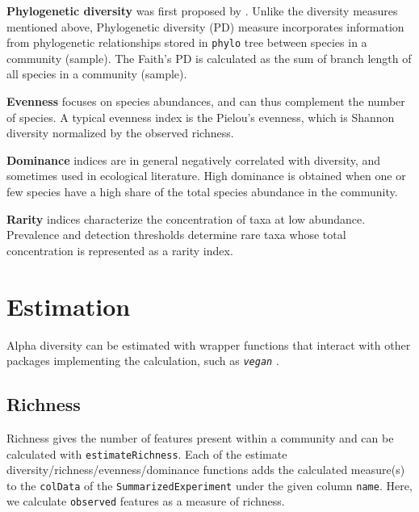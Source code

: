 \documentclass[
]{book}
\newenvironment{Shaded}{\begin{snugshade}}{\end{snugshade}}
\newcommand{\AttributeTok}[1]{\textcolor[rgb]{0.77,0.63,0.00}{#1}}
\newcommand{\FunctionTok}[1]{\textcolor[rgb]{0.00,0.00,0.00}{#1}}
\newcommand{\NormalTok}[1]{#1}
\newcommand{\OtherTok}[1]{\textcolor[rgb]{0.56,0.35,0.01}{#1}}
\newcommand{\SpecialCharTok}[1]{\textcolor[rgb]{0.00,0.00,0.00}{#1}}
\newcommand{\StringTok}[1]{\textcolor[rgb]{0.31,0.60,0.02}{#1}}
\begin{document}
\textbf{Phylogenetic diversity} was first proposed by \citep{Faith1992}. Unlike the
diversity measures mentioned above, Phylogenetic diversity (PD)
measure incorporates information from phylogenetic relationships
stored in \texttt{phylo} tree between species in a community (sample). The
Faith's PD is calculated as the sum of branch length of all species in
a community (sample).

\textbf{Evenness} focuses on species abundances, and can thus complement
the number of species. A typical evenness index is the Pielou's
evenness, which is Shannon diversity normalized by the observed
richness.

\textbf{Dominance} indices are in general negatively correlated with
diversity, and sometimes used in ecological literature. High
dominance is obtained when one or few species have a high share of
the total species abundance in the community.

\textbf{Rarity} indices characterize the concentration of taxa at low abundance.
Prevalence and detection thresholds determine rare taxa whose total concentration
is represented as a rarity index.

\hypertarget{estimation}{%
\section{Estimation}\label{estimation}}

Alpha diversity can be estimated with wrapper functions that interact
with other packages implementing the calculation, such as \emph{\texttt{vegan}}
\citep{R_vegan}.

\hypertarget{richness}{%
\subsection{Richness}\label{richness}}

Richness gives the number of features present within a community and can be calculated with \texttt{estimateRichness}. Each of the estimate diversity/richness/evenness/dominance functions adds the calculated measure(s) to the \texttt{colData} of the \texttt{SummarizedExperiment} under the given column \texttt{name}. Here, we calculate \texttt{observed} features as a measure of richness.

\begin{Shaded}
\end{Shaded}
\end{document}
